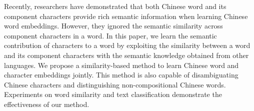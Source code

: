 Recently, researchers have demonstrated that both Chinese word and its component characters provide rich semantic information when learning Chinese word embeddings. However, they ignored the semantic similarity across component characters in a word. In this paper, we learn the semantic contribution of characters to a word by exploiting the similarity between a word and its component characters with the semantic knowledge obtained from other languages. We propose a similarity-based method to learn Chinese word and character embeddings jointly. This method is also capable of disambiguating Chinese characters and distinguishing non-compositional Chinese words. Experiments on word similarity and text classification demonstrate the effectiveness of our method.
